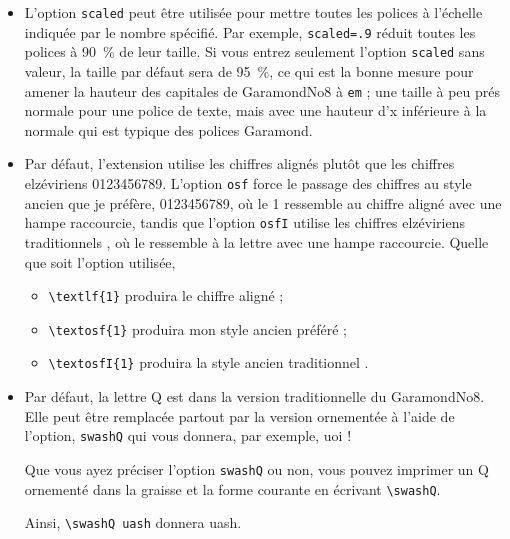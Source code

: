 \documentclass[12pt,english,french]{article}
\newcommand{\mnu}[1]{\texttt{#1}}
\begin{document}
\begin{itemize}
\item
L'option \mnu{scaled} peut être utilisée pour mettre toutes les polices à l'échelle indiquée par le nombre spécifié. Par exemple, \mnu{scaled=.9} réduit toutes les polices à \SI{90}{\%} de leur taille. Si vous entrez seulement l'option \mnu{scaled} sans valeur, la taille par défaut sera de \SI{95}{\%}, ce qui est la bonne mesure pour amener la hauteur des capitales de GaramondNo8 à  \mnu{em} ; une taille à peu prés normale pour une police de texte, mais avec une hauteur d'x inférieure à la normale qui est typique des polices Garamond.
\item
Par défaut, l'extension utilise les chiffres alignés  plutôt que les chiffres elzéviriens 0123456789. L'option \mnu{osf} force le passage des chiffres au style ancien que je préfère, 0123456789, où le 1 ressemble au chiffre  aligné avec une hampe raccourcie, tandis que l'option \mnu{osfI} utilise les chiffres elzéviriens  traditionnels , où le  ressemble à la lettre  avec une hampe raccourcie. Quelle que soit l'option utilisée,


\begin{itemize}
\item
\verb+\textlf{1}+ produira le chiffre  aligné ; 
\item
\verb+\textosf{1}+ produira mon style ancien préféré  ;
\item
\verb+\textosfI{1}+ produira la style ancien traditionnel . 
\end{itemize}

\item
Par défaut, la lettre Q est dans la version traditionnelle du GaramondNo8. Elle peut être remplacée partout par la version ornementée à l'aide de l'option, \mnu{swashQ} qui vous donnera, par exemple, \swashQ uoi !

Que vous ayez préciser l'option \mnu{swashQ} ou non, vous pouvez imprimer un Q ornementé dans la graisse et la forme courante en écrivant \verb+\swashQ+. \smallskip

Ainsi, \verb+\swashQ uash+ donnera \swashQ uash.

\end{itemize}

\end{document}
